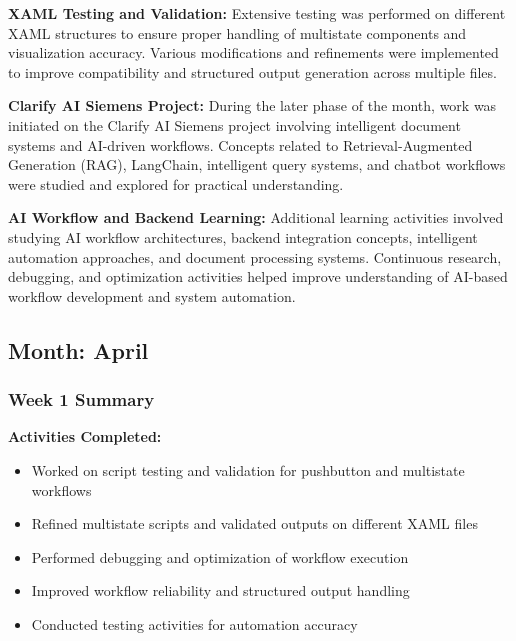 \documentclass[12pt,a4paper]{report}
\begin{document}
\textbf{XAML Testing and Validation:}
Extensive testing was performed on different XAML structures to ensure proper handling of multistate components and visualization accuracy. Various modifications and refinements were implemented to improve compatibility and structured output generation across multiple files.

\textbf{Clarify AI Siemens Project:}
During the later phase of the month, work was initiated on the Clarify AI Siemens project involving intelligent document systems and AI-driven workflows. Concepts related to Retrieval-Augmented Generation (RAG), LangChain, intelligent query systems, and chatbot workflows were studied and explored for practical understanding.

\textbf{AI Workflow and Backend Learning:}
Additional learning activities involved studying AI workflow architectures, backend integration concepts, intelligent automation approaches, and document processing systems. Continuous research, debugging, and optimization activities helped improve understanding of AI-based workflow development and system automation.

\newpage
\subsection*{Month: April}

\subsubsection*{Week 1 Summary}
\textbf{Activities Completed:}
\begin{itemize}[leftmargin=1.5cm]
    \item Worked on script testing and validation for pushbutton and multistate workflows
    \item Refined multistate scripts and validated outputs on different XAML files
    \item Performed debugging and optimization of workflow execution
    \item Improved workflow reliability and structured output handling
    \item Conducted testing activities for automation accuracy
\end{itemize}
\end{document}
